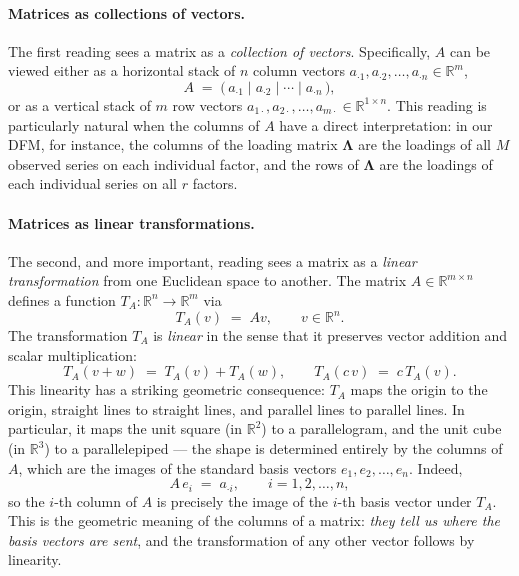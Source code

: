 \documentclass[11pt, a4paper, oneside]{article}
\newcommand{\mL}{\boldsymbol{\Lambda}}
\begin{document}
\paragraph{Matrices as collections of vectors.}
The first reading sees a matrix as a \emph{collection of vectors}.
Specifically, $A$ can be viewed either as a horizontal stack of $n$
column vectors $a_{\cdot 1}, a_{\cdot 2}, \ldots, a_{\cdot n} \in \mathbb{R}^m$,
\[
A \;=\; \big(\,a_{\cdot 1} \;\big|\; a_{\cdot 2} \;\big|\; \cdots \;\big|\; a_{\cdot n}\,\big),
\]
or as a vertical stack of $m$ row vectors $a_{1 \cdot}, a_{2 \cdot}, \ldots, a_{m \cdot} \in \mathbb{R}^{1 \times n}$.
This reading is particularly natural when the columns of $A$ have a
direct interpretation: in our DFM, for instance, the columns of the
loading matrix $\mL$ are the loadings of all $M$ observed series on
each individual factor, and the rows of $\mL$ are the loadings of
each individual series on all $r$ factors.

\paragraph{Matrices as linear transformations.}
The second, and more important, reading sees a matrix as a
\emph{linear transformation} from one Euclidean space to another. The
matrix $A \in \mathbb{R}^{m \times n}$ defines a function
$T_A: \mathbb{R}^n \to \mathbb{R}^m$ via
\[
T_A(v) \;=\; A v, \qquad v \in \mathbb{R}^n.
\]
The transformation $T_A$ is \emph{linear} in the sense that it
preserves vector addition and scalar multiplication:
\[
T_A(v + w) \;=\; T_A(v) + T_A(w), \qquad
T_A(c\, v) \;=\; c\, T_A(v).
\]
This linearity has a striking geometric consequence: $T_A$ maps the
origin to the origin, straight lines to straight lines, and parallel
lines to parallel lines. In particular, it maps the unit square (in
$\mathbb{R}^2$) to a parallelogram, and the unit cube (in
$\mathbb{R}^3$) to a parallelepiped — the shape is determined
entirely by the columns of $A$, which are the images of the standard
basis vectors $e_1, e_2, \ldots, e_n$. Indeed,
\[
A\, e_i \;=\; a_{\cdot i}, \qquad i = 1, 2, \ldots, n,
\]
so the $i$-th column of $A$ is precisely the image of the $i$-th
basis vector under $T_A$. This is the geometric meaning of the
columns of a matrix: \emph{they tell us where the basis vectors are
sent}, and the transformation of any other vector follows by
linearity.
\end{document}
